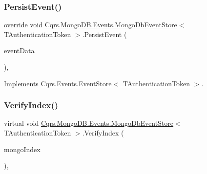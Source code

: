 \subsubsection{\texorpdfstring{Persist\+Event()}{PersistEvent()}}
{\footnotesize\ttfamily override void \hyperlink{classCqrs_1_1MongoDB_1_1Events_1_1MongoDbEventStore}{Cqrs.\+Mongo\+D\+B.\+Events.\+Mongo\+Db\+Event\+Store}$<$ T\+Authentication\+Token $>$.Persist\+Event (\begin{DoxyParamCaption}\item[{\hyperlink{classCqrs_1_1Events_1_1EventData}{Event\+Data}}]{event\+Data }\end{DoxyParamCaption})\hspace{0.3cm}{\ttfamily [protected]}, {\ttfamily [virtual]}}



Implements \hyperlink{classCqrs_1_1Events_1_1EventStore_aedb71ca0ddf21220e323bc60ad7508cd_aedb71ca0ddf21220e323bc60ad7508cd}{Cqrs.\+Events.\+Event\+Store$<$ T\+Authentication\+Token $>$}.

\mbox{\label{classCqrs_1_1MongoDB_1_1Events_1_1MongoDbEventStore_a6a6f0303cd412974d90be87d281e81f5_a6a6f0303cd412974d90be87d281e81f5}} 
\subsubsection{\texorpdfstring{Verify\+Index()}{VerifyIndex()}}
{\footnotesize\ttfamily virtual void \hyperlink{classCqrs_1_1MongoDB_1_1Events_1_1MongoDbEventStore}{Cqrs.\+Mongo\+D\+B.\+Events.\+Mongo\+Db\+Event\+Store}$<$ T\+Authentication\+Token $>$.Verify\+Index (\begin{DoxyParamCaption}\item[{\hyperlink{classCqrs_1_1MongoDB_1_1DataStores_1_1Indexes_1_1MongoDbIndex}{Mongo\+Db\+Index}$<$ \hyperlink{classCqrs_1_1MongoDB_1_1Events_1_1MongoDbEventData}{Mongo\+Db\+Event\+Data} $>$}]{mongo\+Index }\end{DoxyParamCaption})\hspace{0.3cm}{\ttfamily [protected]}, {\ttfamily [virtual]}}

